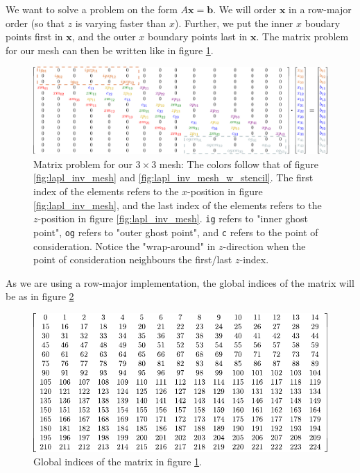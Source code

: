 \documentclass[12pt]{article}
\newcommand{\ve}[1]{\ensuremath{\boldsymbol{#1}}}
\begin{document}
%
We want to solve a problem on the form $A\ve{x}=\ve{b}$. We will order $\ve{x}$
in a row-major order (so that $z$ is varying faster than $x$). Further, we put
the inner $x$ boudary points first in $\ve{x}$, and the outer $x$ boundary
points last in $\ve{x}$. The matrix problem for our mesh can then be written
like in figure \ref{fig:lapl_inv_matrix}.
%
\begin{figure}[htbp!]
    \centering \includegraphics[width=0.85\paperwidth,
    keepaspectratio]{figs/5PointStencilMatrix.pdf}
    \caption{Matrix problem for our $3\times3$ mesh: The colors follow that of
        figure \ref{fig:lapl_inv_mesh} and \ref{fig:lapl_inv_mesh_w_stencil}.
        The first index of the elements refers to the $x$-position in figure
        \ref{fig:lapl_inv_mesh}, and the last index of the elements refers to
        the $z$-position in figure \ref{fig:lapl_inv_mesh}. \texttt{ig} refers
        to "inner ghost point", \texttt{og} refers to "outer ghost point", and
        \texttt{c} refers to the point of consideration. Notice the
        "wrap-around" in $z$-direction when the point of consideration
    neighbours the first/last $z$-index.  }
%
\label{fig:lapl_inv_matrix}
%
\end{figure}
%
As we are using a row-major implementation, the global indices of the matrix
will be as in figure \ref{fig:lapl_inv_global}
%
\begin{figure}[htbp!]
    \centering \includegraphics[width=0.6\paperwidth,
    keepaspectratio]{figs/5PointStencilGlobalIndices.pdf}
    \caption{Global indices of the matrix in figure \ref{fig:lapl_inv_matrix}.
    }
%
\label{fig:lapl_inv_global}
%
\end{figure}
%
\end{document}
